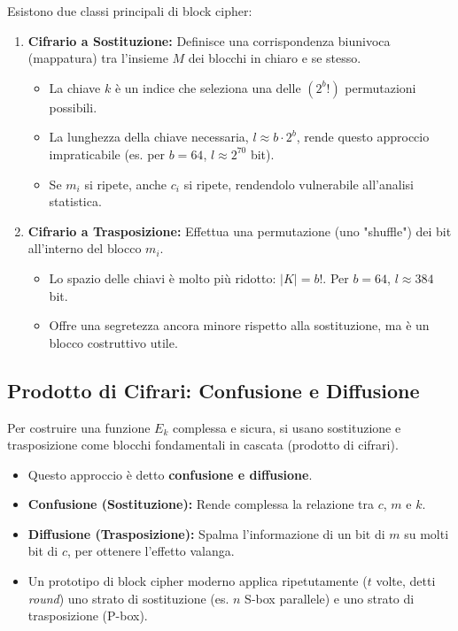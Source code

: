 \documentclass[../main.tex]{subfiles}
\begin{document}
Esistono due classi principali di block cipher:
\begin{enumerate}
    \item \textbf{Cifrario a Sostituzione:} Definisce una corrispondenza biunivoca (mappatura) tra l'insieme $M$ dei blocchi in chiaro e se stesso.
          \begin{itemize}
              \item La chiave $k$ è un indice che seleziona una delle $(2^b!)$ permutazioni possibili.
              \item La lunghezza della chiave necessaria, $l \approx b \cdot 2^b$, rende questo approccio impraticabile (es. per $b=64$, $l \approx 2^{70}$ bit).
              \item Se $m_i$ si ripete, anche $c_i$ si ripete, rendendolo vulnerabile all'analisi statistica.
          \end{itemize}
    \item \textbf{Cifrario a Trasposizione:} Effettua una permutazione (uno "shuffle") dei bit all'interno del blocco $m_i$.
          \begin{itemize}
              \item Lo spazio delle chiavi è molto più ridotto: $|K| = b!$. Per $b=64$, $l \approx 384$ bit.
              \item Offre una segretezza ancora minore rispetto alla sostituzione, ma è un blocco costruttivo utile.
          \end{itemize}
\end{enumerate}

\subsection{Prodotto di Cifrari: Confusione e Diffusione}
Per costruire una funzione $E_k$ complessa e sicura, si usano sostituzione e trasposizione come blocchi fondamentali in cascata (prodotto di cifrari).
\begin{itemize}
    \item Questo approccio è detto \textbf{confusione e diffusione}.
    \item \textbf{Confusione (Sostituzione):} Rende complessa la relazione tra $c$, $m$ e $k$.
    \item \textbf{Diffusione (Trasposizione):} Spalma l'informazione di un bit di $m$ su molti bit di $c$, per ottenere l'effetto valanga.
    \item Un prototipo di block cipher moderno applica ripetutamente ($t$ volte, detti \emph{round}) uno strato di sostituzione (es. $n$ S-box parallele) e uno strato di trasposizione (P-box).
\end{itemize}
\end{document}
